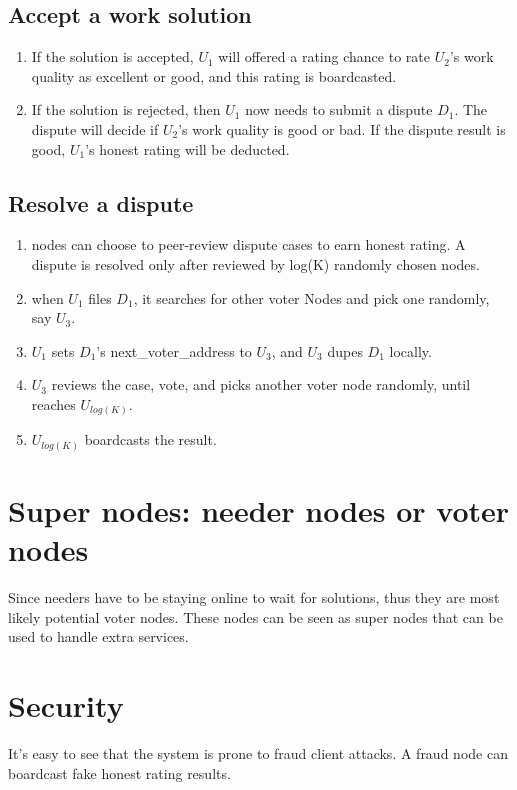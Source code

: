 \documentclass[12pt]{article}
\begin{document}
\subsection{Accept a work solution}
\begin{enumerate}
	\item If the solution is accepted, $U_1$ will offered a rating chance to rate $U_2$'s work quality as excellent or good, and this rating is boardcasted.
	\item If the solution is rejected, then $U_1$ now needs to submit a dispute $D_1$. The dispute will decide if $U_2$'s work quality is good or bad. If the dispute result is good, $U_1$'s honest rating will be deducted. 
\end{enumerate}

\subsection{Resolve a dispute}
\begin{enumerate}
	\item nodes can choose to peer-review dispute cases to earn honest rating. A dispute is resolved only after reviewed by log(K) randomly chosen nodes.
	\item when $U_1$ files $D_1$, it searches for other voter Nodes and pick one randomly, say $U_3$. 
	\item $U_1$ sets $D_1$'s next\_voter\_address to $U_3$, and $U_3$ dupes $D_1$ locally. 
	\item $U_3$ reviews the case, vote, and picks another voter node randomly, until reaches $U_{log(K)}$.
	\item $U_{log(K)}$ boardcasts the result.
\end{enumerate}

\section{Super nodes: needer nodes or voter nodes}
Since needers have to be staying online to wait for solutions, thus they are most likely potential voter nodes. These nodes can be seen as super nodes that can be used to handle extra services.

\section{Security}
It's easy to see that the system is prone to fraud client attacks. A fraud node can boardcast fake honest rating results. 

\begin{thebibliography}{9}
\end{thebibliography}

	
\end{document}
